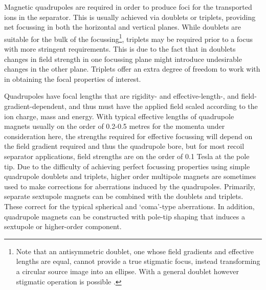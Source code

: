Magnetic quadrupoles are required in order to produce foci for the transported ions in the separator. This is usually achieved via doublets or triplets, providing net focussing in both the horizontal and vertical planes. While doublets are suitable for the bulk of the focussing\footnote{Note that an antisymmetric doublet, one whose field gradients and effective lengths are equal, cannot provide a true stigmatic focus, instead transforming a circular source image into an ellipse. With a general doublet however stigmatic operation is possible \cite{reg67}.}, triplets may be required prior to a focus with more stringent requirements. This is due to the fact that in doublets changes in field strength in one focussing plane might introduce undesirable changes in the other plane. Triplets offer an extra degree of freedom to work with in obtaining the focal properties of interest.  

Quadrupoles have focal lengths that are rigidity- and effective-length-, and field-gradient-dependent, and thus must have the applied field scaled according to the ion charge, mass and energy.  With typical effective lengths of quadrupole magnets usually on the order of 0.2-0.5 metres for the momenta under consideration here, the strengths required for effective focussing will depend on the field gradient required and thus the quadrupole bore, but for most recoil separator applications, field strengths are on the order of 0.1 Tesla at the pole tip. Due to the difficulty of achieving perfect focussing properties using simple quadrupole doublets and triplets, higher order multipole magnets are sometimes used to make corrections for aberrations induced by the quadrupoles. Primarily, separate sextupole magnets can be combined with the doublets and triplets. These correct for the typical spherical and `coma'-type aberrations. In addition, quadrupole magnets can be constructed with pole-tip shaping that induces a sextupole or higher-order component.  

